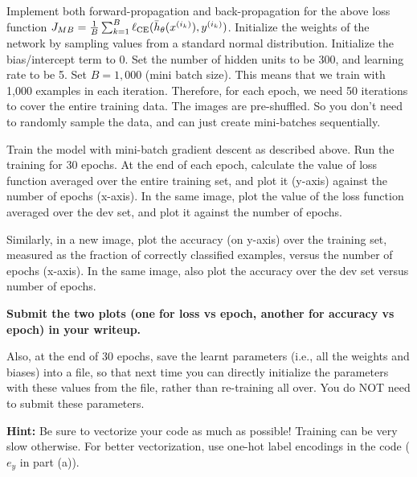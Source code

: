 \item {} 


Implement both forward-propagation and back-propagation for the above loss function $J_{MB} = \frac{1}{B}\sum_{k=1}^B \ell_\textup{CE}(\bar{h}_{\theta}(x^{(i_k)}),y^{(i_k)})
$.
Initialize the weights of the network by sampling values from a standard normal
distribution. Initialize the bias/intercept term to 0.
Set the number of hidden units to be 300, and learning rate to be 5. Set $B = 1,000$
(mini batch size). This means that we train with 1,000 examples in each iteration.
Therefore, for each epoch, we need 50 iterations to cover the entire training data.
The images are pre-shuffled. So you don't need to randomly sample the data, and can
just create mini-batches sequentially.


Train the model with mini-batch gradient descent
as described above. Run the training for 30 epochs. At the end of each epoch, calculate
the value of loss function averaged over the entire training set, and plot it
(y-axis) against the number of epochs (x-axis). In the same image, plot the value
of the loss function averaged over the dev set, and plot it against the number of epochs.

Similarly, in a new image, plot the accuracy (on y-axis) over the training set,
measured as the fraction of correctly classified examples, versus the number of epochs
(x-axis). In the same image, also plot the accuracy over the dev set versus number of epochs.

\textbf{Submit the two plots (one for loss vs epoch, another for accuracy vs epoch) in your writeup.}

Also, at the end of 30 epochs, save the learnt parameters (i.e., all the weights and biases)
into a file, so that next time you can directly initialize the parameters with
these values from the file, rather than re-training all over. You do NOT need to
submit these parameters.



\textbf{Hint:} Be sure to vectorize your code as much as possible! Training can be
very slow otherwise. For better vectorization, use one-hot label encodings in the code ($e_y$ in part (a)).
